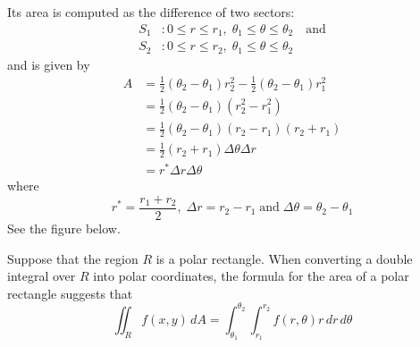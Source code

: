 \documentclass[handout]{ximera}
\begin{document}
Its area is computed as the difference of two sectors: 
\begin{align*}
S_1&: 0 \leq r\leq r_1, \; \theta_1 \leq \theta \leq \theta_2 \quad\text{and} \\
S_2&: 0 \leq r\leq r_2, \; \theta_1 \leq \theta \leq \theta_2
\end{align*}
and is given by
\begin{align*}
A &= \frac12 (\theta_2 - \theta_1) r_2^2 - \frac12 (\theta_2 -\theta_1) r_1^2\\
  &= \frac12 (\theta_2 - \theta_1) (r_2^2 - r_1^2)\\
  &= \frac12 (\theta_2 - \theta_1) (r_2 - r_1)(r_2 + r_1)\\
  &= \frac12(r_2 + r_1) \Delta \theta \Delta r \\
  &= r^* \Delta r \Delta \theta
\end{align*}
where
\[
r^* = \frac{r_1 + r_2}{2}, \; \Delta r = r_2 - r_1 \; \text{and}\; \Delta \theta = \theta_2 - \theta_1
\]
See the figure below.

\begin{image}
\end{image}


Suppose that the region $R$ is a polar rectangle. 
When converting a double integral over $R$ into polar coordinates, the formula for the area of a polar rectangle suggests that
\[
\iint_R f(x,y) \, dA = \int_{\theta_1}^{\theta_2} \int_{r_1}^{r_2} f(r, \theta) r \, dr\, d\theta
\]
\end{document}
